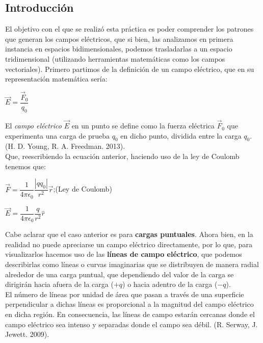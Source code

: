 \documentclass[a4paper,10pt]{article}
\begin{document}
\begin{multicols}{2}
\section{\textcolor{MiColor1}{\textbf{Introducción}}}
El objetivo con el que se realizó esta práctica es poder comprender los patrones que generan los campos eléctricos, que si bien, las analizamos en primera instancia en espacios bidimensionales, podemos trasladarlas a un espacio tridimensional (utilizando herramientas matemáticas como los campos vectoriales). Primero partimos de la definición de un campo eléctrico, que en su representación matemática sería:\par
    \vspace{2mm}
    \centerline{$\Vec{E}=\dfrac{\Vec{F}_0}{q_0}$} \par
El \textit{campo eléctrico} $\Vec{E}$ en un punto se define como la fuerza eléctrica $\Vec{F}_0$ que experimenta una carga de prueba $q_0$ en dicho punto, dividida entre la carga $q_0$. (H. D. Young, R. A. Freedman. 2013)\cite{2}. \\
Que, reescribiendo la ecuación anterior, haciendo uso de la ley de Coulomb tenemos que:\par
    \vspace{2mm}
    \centerline{$\Vec{F}=\dfrac{1}{4\pi{\epsilon}_0}\dfrac{|qq_0|}{r^2}\Vec{r}$\hspace{1em};\hspace{1em}(Ley de Coulomb)}\par
    \vspace{1em}
    \centerline{$\Vec{E}=\dfrac{1}{4\pi{\epsilon}_0}\dfrac{q}{r^2}\hat{r}$}\par
    \vspace{2mm}
Cabe aclarar que el caso anterior es para \textbf{cargas puntuales}. Ahora bien, en la realidad no puede apreciarse un campo eléctrico directamente, por lo que, para visualizarlos hacemos uso de las \textbf{líneas de campo eléctrico}, que podemos describirlas como líneas o curvas imaginarias que se distribuyen de manera radial alrededor de una carga puntual, que dependiendo del valor de la carga se dirigirán hacia afuera de la carga ($+q$) o hacia adentro de la carga ($-q$).\\
El número de líneas por unidad de área que pasan a través de una superficie perpendicular a dichas líneas es proporcional a la magnitud del campo eléctrico en
dicha región. En consecuencia, las líneas de campo estarán cercanas donde el campo
eléctrico sea intenso y separadas donde el campo sea débil. (R. Serway, J. Jewett. 2009)\cite{1}.\par

\end{multicols}
\end{document}
